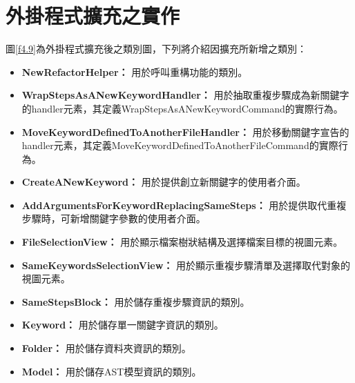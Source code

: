 \section{外掛程式擴充之實作}\label{s4.6}
\indent
圖\ref{f4.9}為外掛程式擴充後之類別圖，下列將介紹因擴充所新增之類別：

\begin{itemize}

\item\textbf{NewRefactorHelper：}
用於呼叫重構功能的類別。

\item\textbf{WrapStepsAsANewKeywordHandler：}
用於抽取重複步驟成為新關鍵字的handler元素，其定義WrapStepsAsANewKeywordCommand的實際行為。

\item\textbf{MoveKeywordDefinedToAnotherFileHandler：}
用於移動關鍵字宣告的handler元素，其定義MoveKeywordDefinedToAnotherFileCommand的實際行為。

\item\textbf{CreateANewKeyword：}
用於提供創立新關鍵字的使用者介面。

\item\textbf{AddArgumentsForKeywordReplacingSameSteps：}
用於提供取代重複步驟時，可新增關鍵字參數的使用者介面。

\item\textbf{FileSelectionView：}
用於顯示檔案樹狀結構及選擇檔案目標的視圖元素。

\item\textbf{SameKeywordsSelectionView：}
用於顯示重複步驟清單及選擇取代對象的視圖元素。

\item\textbf{SameStepsBlock：}
用於儲存重複步驟資訊的類別。

\item\textbf{Keyword：}
用於儲存單一關鍵字資訊的類別。

\item\textbf{Folder：}
用於儲存資料夾資訊的類別。

\item\textbf{Model：}
用於儲存AST模型資訊的類別。

\end{itemize}

